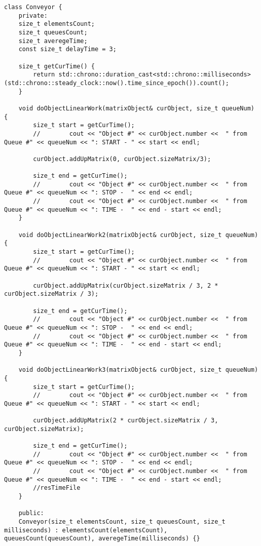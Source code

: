 \documentclass[12pt]{report}
\begin{document}
\begin{lstlisting}[label=some-code,caption=Код программы]
class Conveyor {
	private:
	size_t elementsCount;
	size_t queuesCount;
	size_t averegeTime;
	const size_t delayTime = 3;
	
	size_t getCurTime() {
		return std::chrono::duration_cast<std::chrono::milliseconds>(std::chrono::steady_clock::now().time_since_epoch()).count();
	}
	
	void doObjectLinearWork(matrixObject& curObject, size_t queueNum) {
		size_t start = getCurTime();
		//        cout << "Object #" << curObject.number <<  " from Queue #" << queueNum << ": START - " << start << endl;
		
		curObject.addUpMatrix(0, curObject.sizeMatrix/3);
		
		size_t end = getCurTime();
		//        cout << "Object #" << curObject.number <<  " from Queue #" << queueNum << ": STOP -  " << end << endl;
		//        cout << "Object #" << curObject.number <<  " from Queue #" << queueNum << ": TIME -  " << end - start << endl;
	}
	
	void doObjectLinearWork2(matrixObject& curObject, size_t queueNum) {
		size_t start = getCurTime();
		//        cout << "Object #" << curObject.number <<  " from Queue #" << queueNum << ": START - " << start << endl;
		
		curObject.addUpMatrix(curObject.sizeMatrix / 3, 2 * curObject.sizeMatrix / 3);
		
		size_t end = getCurTime();
		//        cout << "Object #" << curObject.number <<  " from Queue #" << queueNum << ": STOP -  " << end << endl;
		//        cout << "Object #" << curObject.number <<  " from Queue #" << queueNum << ": TIME -  " << end - start << endl;
	}
	
	void doObjectLinearWork3(matrixObject& curObject, size_t queueNum) {
		size_t start = getCurTime();
		//        cout << "Object #" << curObject.number <<  " from Queue #" << queueNum << ": START - " << start << endl;
		
		curObject.addUpMatrix(2 * curObject.sizeMatrix / 3, curObject.sizeMatrix);
		
		size_t end = getCurTime();
		//        cout << "Object #" << curObject.number <<  " from Queue #" << queueNum << ": STOP -  " << end << endl;
		//        cout << "Object #" << curObject.number <<  " from Queue #" << queueNum << ": TIME -  " << end - start << endl;
		//resTimeFile
	}
	
	public:
	Conveyor(size_t elementsCount, size_t queuesCount, size_t milliseconds) : elementsCount(elementsCount), queuesCount(queuesCount), averegeTime(milliseconds) {}
	

\end{lstlisting}
\end{document}
